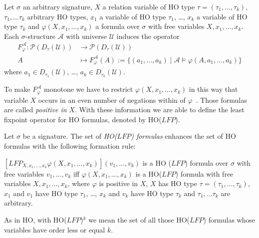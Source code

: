 \begin{definition}
    Let $\sigma$ an arbitrary signature, $X$ a relation variable of HO type $\tau = (\tau_1, \dots, \tau_k)$,
    $\tau_1, \dots \tau_k$ arbitrary HO types, $x_1$ a variable of HO type $\tau_1$, \dots, $x_k$ a
    variable of HO type $\tau_k$ and $\varphi(X, x_1, \dots, x_k)$ a formula over $\sigma$ with free variables $X, x_1,
    \dots, x_k$. Each $\sigma$-structure $\mathcal{A}$ with universe $\mathcal{U}$ induces the operator
    \begin{align*}
        F_\varphi^\mathcal{A}:\mathscr{P}(D_\tau(\mathcal{U})) &\longrightarrow \mathscr{P}(D_\tau(\mathcal{U}))\\
        A &\longmapsto F_\varphi^\mathcal{A}(A) := \{(a_1, \dots, a_k) \mid \mathcal{A} \models \varphi(A, a_1,
        \dots, a_k)\}
    \end{align*}
    where $a_1 \in D_{\tau_1}(\mathcal{U})$, \dots, $a_k \in D_{\tau_k}(\mathcal{U})$.
\end{definition}

To make $F_\varphi^\mathcal{A}$ monotone we have to restrict $\varphi(X, x_1, \dots, x_k)$ in this way that variable
$X$ occurs in an even number of negations within of $\varphi$~\cite{freireMartins2011descriptive}. Those formulas
are called \textit{positive in} $X$. With these information we are able to define the least fixpoint operator for HO
formulas, denoted by HO($\mathit{LFP}$).

\begin{definition}
    Let $\sigma$ be a signature. The set of \emph{HO($\mathit{LFP}$) formulas} enhances the set of HO formulas with the
    following formation rule:
    \begin{compactitem}
        \item $[\mathit{LFP}_{X, x_1, \dots, x_k}\varphi(X, x_1, \dots, x_k)](v_1, \dots, v_k)$ is a HO
        ($\mathit{LFP}$) formula over $\sigma$ with free variables $v_1, \dots, v_k$ iff $\varphi(X, x_1, \dots, x_k)
        $ is a HO($\mathit{LFP}$) formula with free variables $X, x_1, \dots, x_k$, where $\varphi$ is positive in
        $X$, $X$ has HO type $\tau = (\tau_1, \dots, \tau_k)$, $x_1$ and $v_1$ have HO type $\tau_1$, \dots, $x_k$
        and $v_k$ have HO type $\tau_k$ and $\tau_1, \dots \tau_k$ are arbitrary.
    \end{compactitem}
\end{definition}

As in HO, with HO($\mathit{LFP}$)$^k$ we mean the set of all those HO($\mathit{LFP}$) formulas whose variables have
order less or equal $k$.

